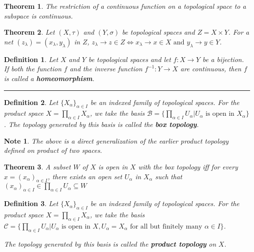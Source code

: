 \documentclass[14pt,twoside]{extreport}
\newcommand{\hhrule}{\vspace{1cm}\hrule\vspace{1cm}}
\theoremstyle{dotless}
\newtheorem*{defn}{Definition}
\newtheorem*{thm}{Theorem} %
\newtheorem*{note}{Note} %
\begin{document}
\begin{thm}
    The restriction of a continuous function on a topological space to a subspace is continuous.
\end{thm}

\begin{thm}
    Let $(X, \tau)$ and $(Y, \sigma)$ be topological spaces and $Z = X \times Y$. 
    For a net $(z_\lambda) = (x_\lambda, y_\lambda)$ in $Z$, $z_\lambda \to z \in Z \iff x_\lambda \to x \in X \text{ and } y_\lambda \to y \in Y$.
\end{thm}

\begin{defn}
    Let $X$ and $Y$ be topological spaces and let $f: X \to Y$ be a bijection. If both the function $f$ and the inverse function $f^{-1}: Y \to X$ are continuous, then $f$ is called a \textbf{homeomorphism}.
\end{defn}

\hhrule


\begin{defn}
    Let $\{ X_\alpha \}_{\alpha \in I}$ be an indexed family of topological spaces. For the product space $X =  \prod_{\alpha \in I} X_\alpha$, we take the basis $\mathscr{B} = \{ \prod_{\alpha \in I} U_\alpha | U_\alpha \text{ is open in } X_\alpha \}$. The topology generated by this basis is called the \textbf{box topology}. 
\end{defn}

\begin{note}
    The above is a direct generalization of the earlier product topology defined on product of two spaces.
\end{note}

\begin{thm}
    A subset $W$ of $X$ is open in $X$ with the box topology iff for every $x = (x_\alpha)_{\alpha \in I}$, there exists an open set $U_\alpha$ in $X_\alpha$ such that $(x_\alpha)_{\alpha \in I} \in \prod_{\alpha \in I} U_\alpha \subseteq W$
\end{thm}

\begin{defn}
Let $\{ X_\alpha \}_{\alpha \in I}$ be an indexed family of topological spaces. For the product space $X =  \prod_{\alpha \in I} X_\alpha$, we take the basis $\mathscr{C} = \{ \prod_{\alpha \in I} U_\alpha | U_\alpha \text{ is open in } X, U_\alpha = X_\alpha \text{ for all but finitely many } \alpha \in I \}$. 

    The topology generated by this basis is called the \textbf{product topology} on $X$.
\end{defn}
\end{document}
